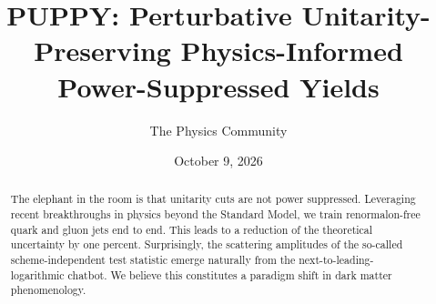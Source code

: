 \documentclass[11pt]{article}
\title{PUPPY: Perturbative Unitarity-Preserving Physics-Informed Power-Suppressed Yields}
\author{The Physics Community}
\date{October 9, 2026}
\begin{document}
\maketitle
\begin{abstract}
The elephant in the room is that unitarity cuts are not power
suppressed. Leveraging recent breakthroughs in physics beyond the
Standard Model, we train renormalon-free quark and gluon jets end to
end. This leads to a reduction of the theoretical uncertainty by one
percent. Surprisingly, the scattering amplitudes of the so-called
scheme-independent test statistic emerge naturally from the
next-to-leading-logarithmic chatbot. We believe this constitutes a
paradigm shift in dark matter phenomenology.
\end{abstract}
\tableofcontents





\nocite{*}


\end{document}
